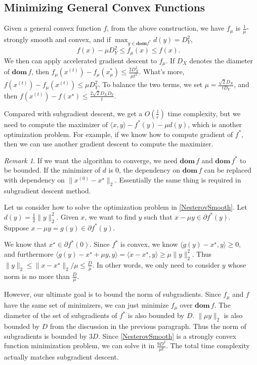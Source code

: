 \documentclass[openany]{book}
\theoremstyle{definition}
\theoremstyle{remark}
\newtheorem*{remark}{Remark}
\begin{document}
\subsection{Minimizing General Convex Functions}
Given a general convex function $f$, from the above construction, we have $f_{\mu}$ is $\frac{1}{\mu}$-strongly smooth and convex, and if $\max_{y\in \mathbf{dom }f^*}d(y)=D_Y^2$,
\begin{equation}
    f(x)-\mu D_Y^2\le f_{\mu}(x)\le f(x).
\end{equation}
We then can apply accelerated gradient descent to $f_{\mu}$. If $D_X$ denotes the diameter of $\mathbf{dom }\,f$, then $f_{\mu}(x^{(t)})-f_{\mu}(x_{\mu}^*)\le \frac{2D_X^2}{\mu t^2}$. What's more, $f(x^{(t)})-f_{\mu}(x^{(t)})\le\mu D_Y^2$. To balance the two terms, we set $\mu=\frac{\sqrt{2}D_X}{tD_Y}$, and then $f(x^{(t)})-f(x^{\star})\le \frac{2\sqrt{2}D_XD_Y}{t}$.

Compared with subgradient descent, we get a $O(\frac{1}{\epsilon})$ time complexity, but we need to compute the maximizer of $\langle x,y\rangle-f^*(y)-\mu d(y)$, which is another optimization problem. For example, if we know how to compute gradient of $f^*$, then we can use another gradient descent to compute the maximizer.

\begin{remark}
    If we want the algorithm to converge, we need $\mathbf{dom }\,f$ and $\mathbf{dom }\,f^*$ to be bounded. If the minimizer of $d$ is $0$, the dependency on $\mathbf{dom }\,f$ can be replaced with dependency on $\|x^{(0)}-x^{\star}\|_2$. Essentially the same thing is required in subgradient descent method.
\end{remark}

Let us consider how to solve the optimization problem in \eqref{NesterovSmooth}. Let $d(y)=\frac{1}{2}\|y\|_2^2$. Given $x$, we want to find $y$ such that $x-\mu y\in\partial f^*(y)$. Suppose $x-\mu y=g(y)\in\partial f^*(y)$.

We know that $x^{\star}\in\partial f^*(0)$. Since $f^*$ is convex, we know $\langle g(y)-x^{\star},y\rangle\ge0$, and furthermore $\langle g(y)-x^{\star}+\mu y,y\rangle=\langle x-x^{\star},y\rangle\ge\mu\|y\|_2^2$. Thus $\|y\|_2\le\|x-x^{\star}\|_2/\mu\le \frac{D}{\mu}$. In other words, we only need to consider $y$ whose norm is no more than $\frac{D}{\mu}$.

However, our ultimate goal is to bound the norm of subgradients. Since $f_{\mu}$ and $f$ have the same set of minimizers, we can just minimize $f_{\mu}$ over $\mathbf{dom }\,f$. The diameter of the set of subgradients of $f^*$ is also bounded by $D$. $\|\mu y\|_2$ is also bounded by $D$ from the discussion in the previous paragraph. Thus the norm of subgradients is bounded by $3D$. Since \eqref{NesterovSmooth} is a strongly convex function minimization problem, we can solve it in $\frac{9D^2}{\mu t}$. The total time complexity actually matches subgradient descent.
\end{document}
